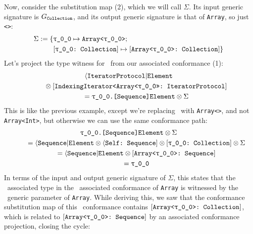 \documentclass[../generics]{subfiles}
\begin{document}
\begin{example}
Now, consider the substitution map (2), which we will call $\Sigma$. Its input generic signature is $G_{\texttt{Collection}}$, and its output generic signature is that of \texttt{Array}, so just \texttt{<\rT>}:
\begin{align*}
\Sigma := \SubstMapC{&\SubstType{\rT}{Array<\rT>}}{\\
&\SubstConf{\rT}{Array<\rT>}{Collection}}
\end{align*}
Let's project the type witness for \nElement\ from our associated conformance (1):
\begin{gather*}
\AIElement \\
\qquad {} \otimes \ConfReq{IndexingIterator<Array<\rT>>}{IteratorProtocol} \\
\qquad {} = \texttt{\rT.[Sequence]Element} \otimes \Sigma
\end{gather*}
This is like the previous example, except we're replacing \rT\ with \texttt{Array<\rT>}, and not \texttt{Array<Int>}, but otherwise we can use the same conformance path:
\begin{gather*}
\texttt{\rT.[Sequence]Element} \otimes \Sigma \\
\qquad {} = \AElement \otimes \SelfSequence \otimes \rTCollection \otimes \Sigma \\
\qquad {} = \AElement \otimes \ArraySequence \\
\qquad {} = \rT
\end{gather*}
In terms of the input and output generic signature of $\Sigma$, this states that the \nElement\ associated type in the \nIterator\ associated conformance of \texttt{Array} is witnessed by the \nElement\ generic parameter of \texttt{Array}. While deriving this, we saw that the conformance substitution map of this \nIterator\ conformance contains $\ArrayCollection$, which is related to $\ArraySequence$ by an associated conformance projection, closing the cycle:
\end{example}

\medskip
\end{document}
